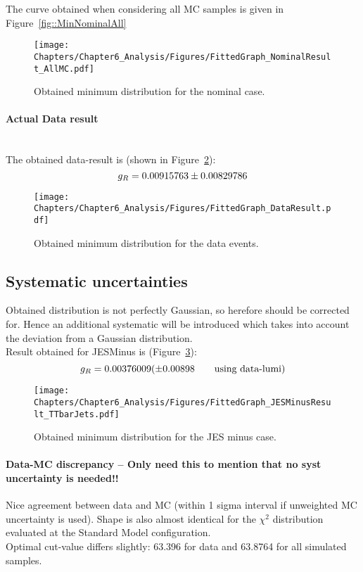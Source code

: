 The curve obtained when considering all MC samples is given in Figure~\ref{fig::MinNominalAll}
\begin{figure}[h!t]
 \centering
 \texttt{[image: Chapters/Chapter6\_Analysis/Figures/FittedGraph\_NominalResult\_AllMC.pdf]}
 \caption{Obtained minimum distribution for the nominal case.} \label{fig::MinNominal}
\end{figure}

\paragraph{Actual Data result} \hfill \\

The obtained data-result is (shown in Figure~\ref{fig::MinData}):
\begin{equation}
 g_{R} = 0.00915763 \pm 0.00829786
\end{equation}

\begin{figure}[h!t]
 \centering
 \texttt{[image: Chapters/Chapter6\_Analysis/Figures/FittedGraph\_DataResult.pdf]}
 \caption{Obtained minimum distribution for the data events.} \label{fig::MinData}
\end{figure}


\subsection{Systematic uncertainties}

Obtained distribution is not perfectly Gaussian, so herefore should be corrected for.
Hence an additional systematic will be introduced which takes into account the deviation from a Gaussian distribution.
\\

Result obtained for JESMinus is (Figure~\ref{fig::MinJESMinus}):
\begin{equation}
 g_{R} = 0.00376009 (\pm 0.00898 \qquad \textrm{using data-lumi})
\end{equation}

\begin{figure}[h!t]
 \centering
 \texttt{[image: Chapters/Chapter6\_Analysis/Figures/FittedGraph\_JESMinusResult\_TTbarJets.pdf]}
 \caption{Obtained minimum distribution for the JES minus case.} \label{fig::MinJESMinus}
\end{figure}

\paragraph{Data-MC discrepancy -- Only need this to mention that no syst uncertainty is needed!!}
Nice agreement between data and MC (within 1 sigma interval if unweighted MC uncertainty is used). 
Shape is also almost identical for the $\chi^{2}$ distribution evaluated at the Standard Model configuration.\\
Optimal cut-value differs slightly: 63.396 for data and 63.8764 for all simulated samples.


